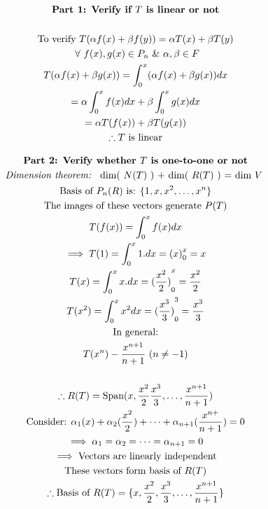 \documentclass[english,course,fleqn]{lecture}
\newenvironment{qanda}{\setlength{\parindent}{0pt}}{\bigskip}
\begin{document}
\begin{qanda}
  \begin{gather*}
    \text{\textbf{Part 1: Verify if $T$ is linear or not}}\\
    \\
    \text{To verify $T(\alpha f(x) + \beta f(y)) = \alpha T(x) + \beta T(y)$}\\
    ~\forall~ f(x), g(x) \in P_{n} ~\&~ \alpha, \beta \in F\\
    T(\alpha f(x) + \beta g(x)) = \int_{0}^{x} (\alpha f(x) + \beta g(x)) dx\\
    = \alpha \int_{0}^{x}f(x)dx + \beta \int_{0}^{x}g(x) dx\\
    = \alpha T(f(x)) + \beta T(g(x))\\
    \therefore \text{$T$ is linear}
  \end{gather*}

  \begin{gather*}
    \text{\textbf{Part 2: Verify whether $T$ is one-to-one or not}}\\
  \text{\textit{Dimension theorem: } dim( $N(T)$ ) + dim( $R(T)$ ) = dim $V$ }\\
  \text{Basis of $P_{n}(R)$ is: }\{1, x, x^{2}, \ldots, x^{n}\}\\
  \text{The images of these vectors generate $P(T)$}\\
  T(f(x)) = \int_{0}^{x}f(x)dx\\
  \implies T(1) =  \int_{0}^{x} 1.dx = {(x)}_{0}^{x} = x\\
  T(x) = \int_{0}^{x}x.dx  = {(\frac{x^{2}}{2})}^{x}_{0} = \frac{x^{2}}{2}\\
  T(x^{2}) = \int_{0}^{x} x^{2} dx = {(\frac{x^{3}}{3})}^{3}_{0} = \frac{x^{3}}{3}\\
  \text{In general:}\\
  T(x^{n}) - \frac{x^{n + 1}}{n + 1}~(n \ne -1)\\
  \\
  \therefore R(T) = \text{Span}(x, \frac{x^{2}}{2} \frac{x^{3}}{3}, \ldots, \frac{x^{n+1}}{n+1})\\
  \text{Consider: }\alpha_{1}(x) + \alpha _{2}(\frac{x^{2}}{2}) + \cdots + \alpha_{n+1}(\frac{x^{n+}}{n+1}) = 0\\ 
  \implies \alpha_{1} = \alpha_{2} = \cdots = \alpha_{n+1} = 0\\
  \implies \text{Vectors are linearly independent}\\
  \text{These vectors form basis of $R(T)$}\\
  \therefore \text{Basis of $R(T)$} = \{x, \frac{x^{2}}{2}, \frac{x^{3}}{3}, \ldots, \frac{x^{n+1}}{n+1}\}\\
  \end{gather*}


\end{qanda}
\end{document}
